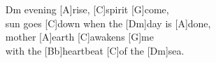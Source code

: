 \def\Titel{Evening Rise}
\def\Interpret{Femail Affairs}
\def\Referenz{text}

\LiedSetup{}

\begin{guitarMagic}
    \begin{enumerate}
        \item [Dm]evening [A]rise, [C]spirit [G]come,\\
            [Bb]sun goes [C]down when the [Dm]day is [A]done,\\
            [Dm]mother [A]earth [C]awakens [G]me\\
            with the [Bb]heartbeat [C]of the [Dm]sea.\\
    \end{enumerate}
\end{guitarMagic}
